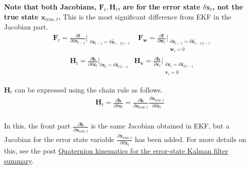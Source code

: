 \documentclass[10pt]{article}
\begin{document}
	\textbf{Note that both Jacobians, $\mathbf{F}_{t}, \mathbf{H}_{t}$, are for the error state $\delta \mathbf{x}_{t}$, not the true state $\mathbf{x}_{\text{true},t}$.} This is the most significant difference from EKF in the Jacobian part.
	\begin{equation} \label{eq:eskf36}
		\boxed { \begin{aligned}
				& \mathbf{F}_{t} = \frac{\partial \mathbf{f}} {\partial \delta \mathbf{x}_{t-1}}\bigg|_{\substack{ \delta \mathbf{x}_{t-1} = \delta \hat{\mathbf{x}}_{t-1|t-1} }} & \mathbf{F}_{\mathbf{w}}  = \frac{\partial \mathbf{f}} {\partial \mathbf{w}_{t}}\bigg|_{\substack{  \delta \mathbf{x}_{t-1} = \delta \hat{\mathbf{x}}_{t-1|t-1} \\ \mathbf{w}_{t}=0}}
		\end{aligned} }
	\end{equation}
	\begin{equation}
		\boxed{ \begin{aligned}
				& \mathbf{H}_{t} = \frac{\partial \mathbf{h}}{\partial \delta \mathbf{x}_{t}}\bigg|_{\delta \mathbf{x}_{t}= \delta  \hat{\mathbf{x}}_{t|t-1}}  & \mathbf{H}_{\mathbf{v}} = \frac{\partial \mathbf{h}}{\partial \mathbf{v}_{t}}\bigg|_{ \substack{  \delta \mathbf{x}_{t}= \delta \hat{\mathbf{x}}_{t|t-1} \\  \mathbf{v}_{t}=0 }}
		\end{aligned} }
	\end{equation}
	
	$\mathbf{H}_{t}$ can be expressed using the chain rule as follows.
	\begin{equation} \label{eq:eskf37}
		\begin{aligned} 
			\mathbf{H}_{t} = \frac{\partial \mathbf{h}}{\partial \delta \mathbf{x}_{t}} = \frac{\partial \mathbf{h}}{\partial \mathbf{x}_{\text{true},t}} \frac{\partial \mathbf{x}_{\text{true},t}}{\partial \delta \mathbf{x}_{t}} \\
		\end{aligned} 
	\end{equation}
	
	In this, the front part $\frac{\partial \mathbf{h}}{\partial \mathbf{x}_{\text{true},t}}$ is the same Jacobian obtained in EKF, but a Jacobian for the error state variable $\frac{\partial \mathbf{x}_{\text{true},t}}{\partial \delta \mathbf{x}_{t}}$ has been added. For more details on this, see the post \href{https://alida.tistory.com/63#6.1.1-jacobian-computation-for-the-filter-correction}{Quaternion kinematics for the error-state Kalman filter summary}.
	
\end{document}
